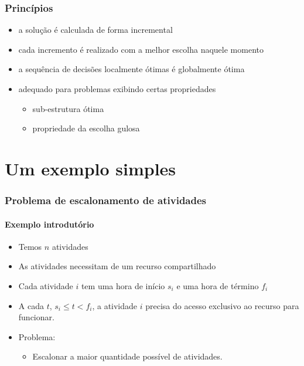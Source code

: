 \documentclass{beamer}
\begin{document}
\begin{frame}
\frametitle{Princípios}

\begin{itemize}
\item a solução é calculada de forma incremental
\item cada incremento é realizado com a melhor escolha naquele momento
\item a sequência de decisões localmente ótimas é globalmente ótima
\item adequado para problemas exibindo certas propriedades
\begin{itemize}
\item sub-estrutura ótima
\item propriedade da escolha gulosa
\end{itemize}

\end{itemize}

\end{frame}


\section{Um exemplo simples}


\begin{frame}
\frametitle{Problema de escalonamento de atividades}
\framesubtitle{Exemplo introdutório}

\begin{itemize}
\item Temos $n$ atividades
\item As atividades necessitam de um recurso compartilhado
\item Cada atividade $i$ tem uma hora de início $s_i$
e uma hora de término $f_i$
\item A cada $t$, $s_i \le t < f_i$, a atividade $i$ precisa
do acesso exclusivo ao recurso para funcionar.
\item Problema:
\begin{itemize}
\item Escalonar a maior quantidade possível de atividades.
\end{itemize}
\end{itemize}

\end{frame}

\end{document}

